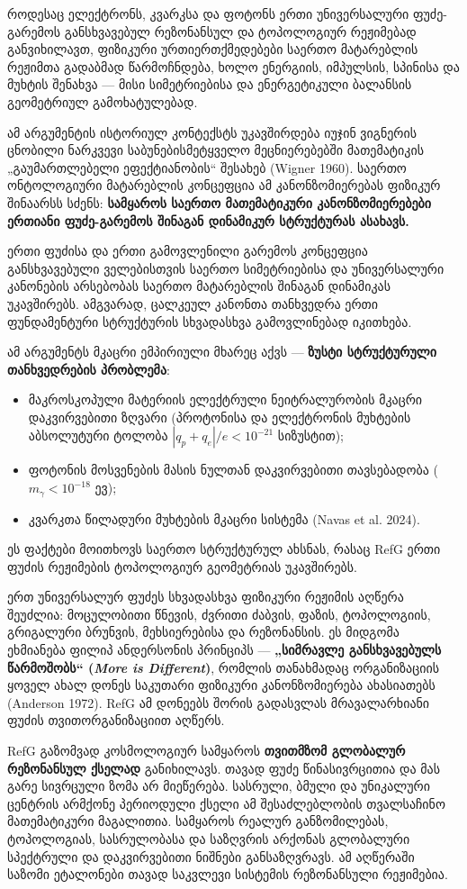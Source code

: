 \documentclass[11pt,a4paper]{article}
\begin{document}
როდესაც ელექტრონს, კვარკსა და ფოტონს ერთი უნივერსალური ფუძე-გარემოს განსხვავებულ რეზონანსულ და ტოპოლოგიურ რეჟიმებად განვიხილავთ, ფიზიკური ურთიერთქმედებები საერთო მატარებლის რეჟიმთა გადაბმად წარმოჩნდება, ხოლო ენერგიის, იმპულსის, სპინისა და მუხტის შენახვა — მისი სიმეტრიებისა და ენერგეტიკული ბალანსის გეომეტრიულ გამოხატულებად.

ამ არგუმენტის ისტორიულ კონტექსტს უკავშირდება იუჯინ ვიგნერის ცნობილი ნარკვევი საბუნებისმეტყველო მეცნიერებებში მათემატიკის „გაუმართლებელი ეფექტიანობის“ შესახებ (Wigner 1960). საერთო ონტოლოგიური მატარებლის კონცეფცია ამ კანონზომიერებას ფიზიკურ შინაარსს სძენს: \textbf{სამყაროს საერთო მათემატიკური კანონზომიერებები ერთიანი ფუძე-გარემოს შინაგან დინამიკურ სტრუქტურას ასახავს.}

ერთი ფუძისა და ერთი გამოვლენილი გარემოს კონცეფცია განსხვავებული ველებისთვის საერთო სიმეტრიებისა და უნივერსალური კანონების არსებობას საერთო მატარებლის შინაგან დინამიკას უკავშირებს. ამგვარად, ცალკეულ კანონთა თანხვედრა ერთი ფუნდამენტური სტრუქტურის სხვადასხვა გამოვლინებად იკითხება.

ამ არგუმენტს მკაცრი ემპირიული მხარეც აქვს — \textbf{ზუსტი სტრუქტურული თანხვედრების პრობლემა}:

\begin{itemize}
\item მაკროსკოპული მატერიის ელექტრული ნეიტრალურობის მკაცრი დაკვირვებითი ზღვარი (პროტონისა და ელექტრონის მუხტების აბსოლუტური ტოლობა $|q_p + q_e|/e < 10^{-21}$ სიზუსტით);
\item ფოტონის მოსვენების მასის ნულთან დაკვირვებითი თავსებადობა ($m_\gamma < 10^{-18} \text{ ევ}$);
\item კვარკთა წილადური მუხტების მკაცრი სისტემა (Navas et al. 2024).

\end{itemize}
ეს ფაქტები მოითხოვს საერთო სტრუქტურულ ახსნას, რასაც RefG ერთი ფუძის რეჟიმების ტოპოლოგიურ გეომეტრიას უკავშირებს.

ერთ უნივერსალურ ფუძეს სხვადასხვა ფიზიკური რეჟიმის აღწერა შეუძლია: მოცულობითი წნევის, ძვრითი ძაბვის, ფაზის, ტოპოლოგიის, გრიგალური ბრუნვის, მეხსიერებისა და რეზონანსის. ეს მიდგომა ეხმიანება ფილიპ ანდერსონის პრინციპს — \textbf{„სიმრავლე განსხვავებულს წარმოშობს“ (\emph{More is Different})}, რომლის თანახმადაც ორგანიზაციის ყოველ ახალ დონეს საკუთარი ფიზიკური კანონზომიერება ახასიათებს (Anderson 1972). RefG ამ დონეებს შორის გადასვლას მრავალარხიანი ფუძის თვითორგანიზაციით აღწერს.

RefG გაზომვად კოსმოლოგიურ სამყაროს \textbf{თვითმზომ გლობალურ რეზონანსულ ქსელად} განიხილავს. თავად ფუძე წინასივრცითია და მას გარე სივრცული ზომა არ მიეწერება. სასრული, ბმული და უნიკალური ცენტრის არმქონე პერიოდული ქსელი ამ შესაძლებლობის თვალსაჩინო მათემატიკური მაგალითია. სამყაროს რეალურ განზომილებას, ტოპოლოგიას, სასრულობასა და საზღვრის არქონას გლობალური სპექტრული და დაკვირვებითი ნიშნები განსაზღვრავს. ამ აღწერაში საზომი ეტალონები თავად საკვლევი სისტემის რეზონანსული რეჟიმებია.
\end{document}
